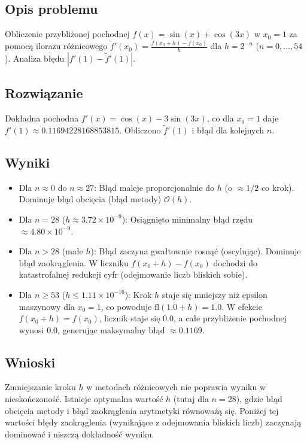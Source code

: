 \documentclass{article}
\begin{document}
\subsection{Opis problemu}
Obliczenie przybliżonej pochodnej $f(x)=\sin(x)+\cos(3x)$ w $x_0=1$ za pomocą ilorazu różnicowego $\tilde{f}'(x_0)=\frac{f(x_0+h)-f(x_0)}{h}$ dla $h=2^{-n}$ ($n=0, \dots, 54$). Analiza błędu $\left|f'(1) - \tilde{f}'(1)\right|$.

\subsection{Rozwiązanie}
Dokładna pochodna $f'(x) = \cos(x) - 3\sin(3x)$, co dla $x_0=1$ daje $f'(1) \approx 0.11694228168853815$. Obliczono $\tilde{f}'(1)$ i błąd dla kolejnych $n$.

\subsection{Wyniki}
\begin{itemize}
    \item Dla $n \approx 0$ do $n \approx 27$: Błąd maleje proporcjonalnie do $h$ (o $\approx 1/2$ co krok). Dominuje błąd obcięcia (błąd metody) $\mathcal{O}(h)$.
    \item Dla $n = 28$ ($h \approx 3.72 \times 10^{-9}$): Osiągnięto minimalny błąd rzędu $\approx 4.80 \times 10^{-9}$.
    \item Dla $n > 28$ (małe $h$): Błąd zaczyna gwałtownie rosnąć (oscylując). Dominuje błąd zaokrąglenia. W liczniku $f(x_0+h)-f(x_0)$ dochodzi do katastrofalnej redukcji cyfr (odejmowanie liczb bliskich sobie).
    \item Dla $n \ge 53$ ($h \le 1.11 \times 10^{-16}$): Krok $h$ staje się mniejszy niż epsilon maszynowy dla $x_0=1$, co powoduje $\text{fl}(1.0+h) = 1.0$. W efekcie $f(x_0+h) = f(x_0)$, licznik staje się $0.0$, a całe przybliżenie pochodnej wynosi $0.0$, generując maksymalny błąd $\approx 0.1169$.
\end{itemize}

\subsection{Wnioski}
Zmniejszanie kroku $h$ w metodach różnicowych nie poprawia wyniku w nieskończoność. Istnieje optymalna wartość $h$ (tutaj dla $n=28$), gdzie błąd obcięcia metody i błąd zaokrąglenia arytmetyki równoważą się. Poniżej tej wartości błędy zaokrąglenia (wynikające z odejmowania bliskich liczb) zaczynają dominować i niszczą dokładność wyniku.
\end{document}
